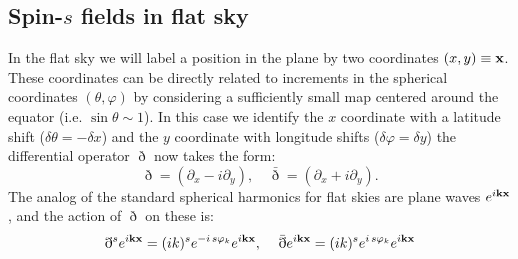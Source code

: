 \documentclass[usenatbib]{mnrasb}
\newcommand{\as}[1]{{\textcolor{red}{[\textbf{AS}: #1]}}}
\newcommand{\dam}[1]{{\textcolor{green}{[\textbf{DA}: #1]}}}
\newcommand{\todo}[1]{{\bf TODO: #1}}
\newcommand{\as}[1]{}
\newcommand{\dam}[1]{}
\newcommand{\todo}[1]{}
\begin{document}
    \subsection{Spin-\texorpdfstring{$s$}{s} fields in flat sky}\label{app:flat.fields}
      In the flat sky we will label a position in the plane by two coordinates $(x,y)\equiv{\bf x}$. These coordinates can be directly related to increments in the spherical coordinates $(\theta,\varphi)$ by considering a sufficiently small map centered around the equator (i.e. $\sin\theta\sim 1$). In this case we identify the $x$ coordinate with a latitude shift ($\delta\theta=-\delta x$) and the $y$ coordinate with longitude
      shifts ($\delta\varphi=\delta y$) the differential operator $\eth$ now takes the form: %
      \begin{equation}
        \eth= (\partial_x-i\partial_y),\hspace{12pt}\bar{\eth}= (\partial_x+i\partial_y).
      \end{equation}
      The analog of the standard spherical harmonics for flat skies are plane waves $e^{i{\bf k}{\bf x}}$, and the action of $\eth$ on these is:
      \begin{equation}
        \eth^s e^{i{\bf k}{\bf x}}=(ik)^se^{-i\,s\varphi_k}e^{i{\bf k}{\bf x}},\hspace{12pt}
        \bar{\eth}e^{i{\bf k}{\bf x}}=(ik)^se^{i\,s\varphi_k}e^{i{\bf k}{\bf x}}
      \end{equation}
  
\end{document}
